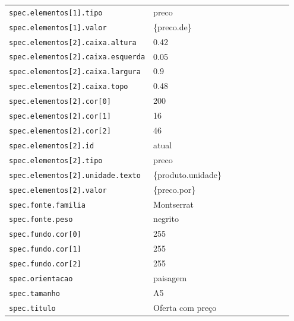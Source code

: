 \begin{tabular}{@{}p{0.35\linewidth}p{0.6\linewidth}@{}}
\texttt{spec.elementos[1].tipo} & preco \\
\texttt{spec.elementos[1].valor} & \{preco.de\} \\
\texttt{spec.elementos[2].caixa.altura} & 0.42 \\
\texttt{spec.elementos[2].caixa.esquerda} & 0.05 \\
\texttt{spec.elementos[2].caixa.largura} & 0.9 \\
\texttt{spec.elementos[2].caixa.topo} & 0.48 \\
\texttt{spec.elementos[2].cor[0]} & 200 \\
\texttt{spec.elementos[2].cor[1]} & 16 \\
\texttt{spec.elementos[2].cor[2]} & 46 \\
\texttt{spec.elementos[2].id} & atual \\
\texttt{spec.elementos[2].tipo} & preco \\
\texttt{spec.elementos[2].unidade.texto} & \{produto.unidade\} \\
\texttt{spec.elementos[2].valor} & \{preco.por\} \\
\texttt{spec.fonte.familia} & Montserrat \\
\texttt{spec.fonte.peso} & negrito \\
\texttt{spec.fundo.cor[0]} & 255 \\
\texttt{spec.fundo.cor[1]} & 255 \\
\texttt{spec.fundo.cor[2]} & 255 \\
\texttt{spec.orientacao} & paisagem \\
\texttt{spec.tamanho} & A5 \\
\texttt{spec.titulo} & Oferta com preço \\
\end{tabular}
